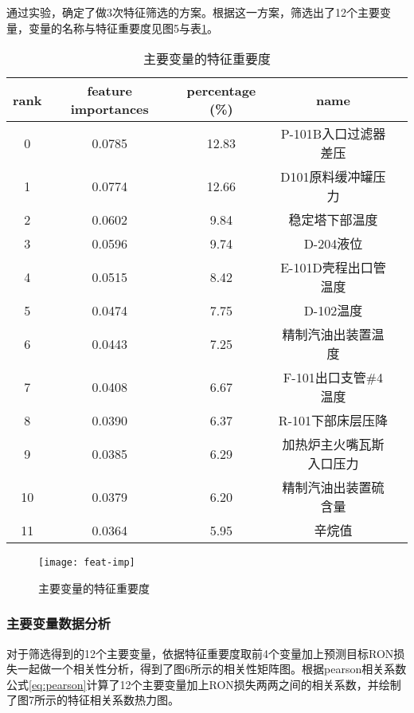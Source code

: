 \documentclass[bwprint]{gmcmthesis}
\begin{document}
通过实验，确定了做3次特征筛选的方案。根据这一方案，筛选出了12个主要变量，变量的名称与特征重要度见图5与表\ref{tab:003}。

\begin{table}[htb]
	\caption{主要变量的特征重要度}\label{tab:003} \centering
	\begin{tabular}{ccccc}
		\toprule[1.5pt]
		rank & feature importances & percentage (\%) &           name \\
		\midrule[1pt]
		0 &              0.0785 &          12.83 &   P-101B入口过滤器差压 \\
		1 &              0.0774 &          12.66 &      D101原料缓冲罐压力 \\
		2 &              0.0602 &           9.84 &         稳定塔下部温度 \\
		3 &              0.0596 &           9.74 &        D-204液位 \\
		4 &              0.0515 &           8.42 &    E-101D壳程出口管温度 \\
		5 &              0.0474 &           7.75 &          D-102温度 \\
		6 &              0.0443 &           7.25 &         精制汽油出装置温度 \\
		7 &              0.0408 &           6.67 &   F-101出口支管\#4温度 \\
		8 &              0.0390 &           6.37 &     R-101下部床层压降 \\
		9 &              0.0385 &           6.29 &       加热炉主火嘴瓦斯入口压力 \\
		10 &              0.0379 &           6.20 &       精制汽油出装置硫含量 \\
		11 &              0.0364 &           5.95 &           辛烷值 \\
		\bottomrule[1.5pt]
	\end{tabular}
\end{table}



\begin{figure}[htb]
	\centering
	\texttt{[image: feat-imp]}
	\caption{主要变量的特征重要度}
\end{figure}


\FloatBarrier
\subsubsection{主要变量数据分析}



对于筛选得到的12个主要变量，依据特征重要度取前4个变量加上预测目标RON损失一起做一个相关性分析，得到了图6所示的相关性矩阵图。根据pearson相关系数公式\eqref{eq:pearson}计算了12个主要变量加上RON损失两两之间的相关系数，并绘制了图7所示的特征相关系数热力图。
\end{document}
